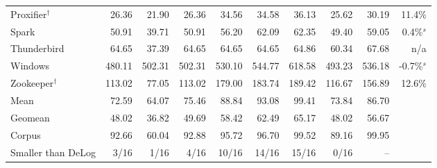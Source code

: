 \begin{table}[t]
\begin{tabular}{lrrrrrrrrr}
Proxifier$^\dagger$ & 26.36 & 21.90 & 26.36 & 34.56 & 34.58 & 36.13 & 25.62 & 30.19 & 11.4\% \\
Spark & 50.91 & 39.71 & 50.91 & 56.20 & 62.09 & 62.35 & 49.40 & 59.05 & 0.4\%$^s$ \\
Thunderbird & 64.65 & 37.39 & 64.65 & 64.65 & 64.65 & 64.86 & 60.34 & 67.68 & n/a \\
Windows & 480.11 & 502.31 & 502.31 & 530.10 & 544.77 & 618.58 & 493.23 & 536.18 & -0.7\%$^s$ \\
Zookeeper$^\dagger$ & 113.02 & 77.05 & 113.02 & 179.00 & 183.74 & 189.42 & 116.67 & 156.89 & 12.6\% \\
\midrule
Mean & 72.59 & 64.07 & 75.46 & 88.84 & 93.08 & 99.41 & 73.84 & 86.70 & \\
Geomean & 48.02 & 36.82 & 49.69 & 58.42 & 62.49 & 65.17 & 48.02 & 56.67 & \\
Corpus & 92.66 & 60.04 & 92.88 & 95.72 & 96.70 & 99.52 & 89.16 & 99.95 & \\
Smaller than DeLog & 3/16 & 1/16 & 4/16 & 10/16 & 14/16 & 15/16 & 0/16 & -- & \\
\bottomrule
\end{tabular}\end{table}
